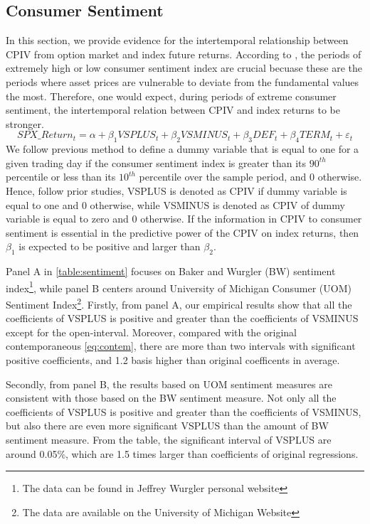 
\subsection{Consumer Sentiment}
In this section, we provide evidence for the intertemporal relationship between CPIV from option market and index future returns. 
According to \textcite{atilgan2015implied}, the periods of extremely high or low consumer sentiment index are crucial becuase these are the periods where asset prices are vulnerable to deviate from the fundamental values the most. Therefore, one would expect, during periods of extreme consumer sentiment, the intertemporal relation between CPIV and index returns to be stronger.
 \begin{equation}  \label{eq:info}
SPX\_Return_{t} = \alpha + \beta _{1}VSPLUS_{t} + \beta _{2}VSMINUS_{t} + \beta _{3}DEF_{t} + \beta _{4}TERM_{t} + \varepsilon _{t}
 \end{equation}
We follow previous method to define a dummy variable that is equal to one for a given trading day if the consumer sentiment index is greater than its $90^{th}$ percentile or less than its $10^{th}$ percentile over the sample period, and 0 otherwise. Hence, follow prior studies, VSPLUS is denoted as CPIV if dummy variable is equal to one and 0 otherwise, while VSMINUS is denoted as CPIV of dummy variable is equal to zero and 0 otherwise. If the information in CPIV to consumer sentiment is essential in the predictive power of the CPIV on index returns, then $\beta _{1}$ is expected to be positive and larger than $\beta _{2}$. 

Panel A in \autoref{table:sentiment} focuses on Baker and Wurgler (BW) sentiment index\footnote{The data can be found in Jeffrey Wurgler personal website}, while panel B centers around University of Michigan Consumer (UOM) Sentiment Index\footnote{The data are available on the University of Michigan Website}. Firstly, from panel A, our empirical results show that all the coefficients of VSPLUS is positive and greater than the coefficients of VSMINUS except for the open-interval. Moreover, compared with the original contemporaneous \autoref{eq:contem}, there are more than two intervals with significant positive coefficients, and 1.2 basis higher than original coefficents in average. 

Secondly, from panel B, the results based on UOM sentiment measures are consistent with those based on the BW sentiment measure. Not only all the coefficients of VSPLUS is positive and greater than the coefficients of VSMINUS, but also there are even more significant VSPLUS than the amount of BW sentiment measure. From the table, the significant interval of VSPLUS are around 0.05\%, which are 1.5 times larger than coefficients of original regressions. 

